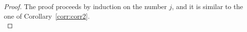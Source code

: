 \corrcompldue*
 
 \begin{proof}
 The proof proceeds by induction on the number $j$, and it is similar to the one of Corollary~\ref{corr:corr2}.\\
 \end{proof}
 
